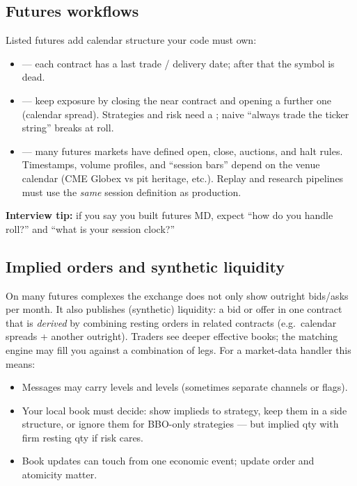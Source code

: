 \subsection{Futures workflows}
\label{subsec:futures-workflows}
Listed futures add calendar structure your code must own:
\begin{itemize}
    \item {} --- each contract has a last trade / delivery date; 
          after that the symbol is dead.
    \item {} --- keep exposure by closing the near contract and 
          opening a further one (calendar spread). Strategies and risk need a 
          ; naive ``always trade the ticker string'' breaks 
          at roll.
    \item {} --- many futures markets have defined open, 
          close, auctions, and halt rules. Timestamps, volume profiles, and 
          ``session bars'' depend on the venue calendar (CME Globex vs pit heritage, 
          etc.). Replay and research pipelines must use the \emph{same} session 
          definition as production.
\end{itemize}
\par\noindent\textbf{Interview tip:} if you say you built futures MD, expect 
``how do you handle roll?'' and ``what is your session clock?''

\subsection{Implied orders and synthetic liquidity}
\label{subsec:futures-implieds}
On many futures complexes the exchange does not only show outright bids/asks per 
month. It also publishes  (synthetic) liquidity: a bid or offer 
in one contract that is \emph{derived} by combining resting orders in related 
contracts (e.g.\ calendar spreads + another outright). Traders see deeper 
effective books; the matching engine may fill you against a combination of legs.
\newline
For a market-data handler this means:
\begin{itemize}
    \item Messages may carry  levels and  
          levels (sometimes separate channels or flags).
    \item Your local book must decide: show implieds to strategy, keep them in a 
          side structure, or ignore them for BBO-only strategies --- but 
           implied qty with firm resting qty if risk cares.
    \item Book updates can touch  from one economic 
          event; update order and atomicity matter.
\end{itemize}

